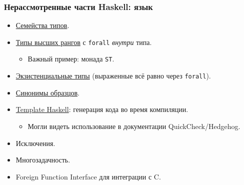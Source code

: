 \documentclass[11pt]{beamer}
\begin{document}
\begin{frame}[fragile]
\frametitle{Нерассмотренные части Haskell: язык}
\begin{itemize}
    \item \href{https://downloads.haskell.org/~ghc/latest/docs/html/users_guide/glasgow_exts.html#type-families}{Семейства типов}.
    \item \href{https://downloads.haskell.org/~ghc/latest/docs/html/users_guide/glasgow_exts.html#arbitrary-rank-polymorphism}{Типы высших рангов} с \lstinline|forall| \emph{внутри} типа.
    \begin{itemize}
        \item Важный пример: монада \lstinline|ST|.
    \end{itemize}
    \item \href{https://downloads.haskell.org/~ghc/latest/docs/html/users_guide/glasgow_exts.html#existentially-quantified-data-constructors}{Экзистенциальные типы} (выраженные всё равно через \lstinline|forall|).
    \item \href{https://downloads.haskell.org/~ghc/latest/docs/html/users_guide/glasgow_exts.html#pattern-synonyms}{Синонимы образцов}.
    \item \href{https://downloads.haskell.org/~ghc/latest/docs/html/users_guide/glasgow_exts.html#template-haskell}{Template Haskell}: генерация кода во время компиляции.
        \begin{itemize}
            \item Могли видеть использование в документации QuickCheck/Hedgehog.
        \end{itemize}
    \item Исключения.
    \item Многозадачность.
    \item Foreign Function Interface для интеграции с C.
\end{itemize}
\end{frame}
\end{document}
